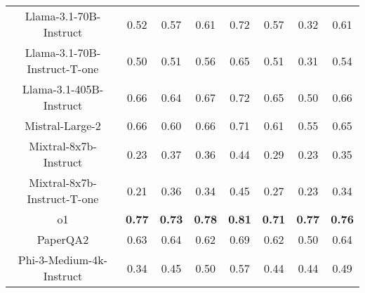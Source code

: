 \begin{tabular}{cccccccc}
Llama-3.1-70B-Instruct & 0.52 & 0.57 & 0.61 & 0.72 & 0.57 & 0.32 & 0.61 \\
Llama-3.1-70B-Instruct-T-one & 0.50 & 0.51 & 0.56 & 0.65 & 0.51 & 0.31 & 0.54 \\
Llama-3.1-405B-Instruct & 0.66 & 0.64 & 0.67 & 0.72 & 0.65 & 0.50 & 0.66 \\
Mistral-Large-2 & 0.66 & 0.60 & 0.66 & 0.71 & 0.61 & 0.55 & 0.65 \\
Mixtral-8x7b-Instruct & 0.23 & 0.37 & 0.36 & 0.44 & 0.29 & 0.23 & 0.35 \\
Mixtral-8x7b-Instruct-T-one & 0.21 & 0.36 & 0.34 & 0.45 & 0.27 & 0.23 & 0.34 \\
o1 & \textbf{0.77} & \textbf{0.73} & \textbf{0.78} & \textbf{0.81} & \textbf{0.71} & \textbf{0.77} & \textbf{0.76} \\
PaperQA2 & 0.63 & 0.64 & 0.62 & 0.69 & 0.62 & 0.50 & 0.64 \\
Phi-3-Medium-4k-Instruct & 0.34 & 0.45 & 0.50 & 0.57 & 0.44 & 0.44 & 0.49 \\
\bottomrule
\end{tabular}
